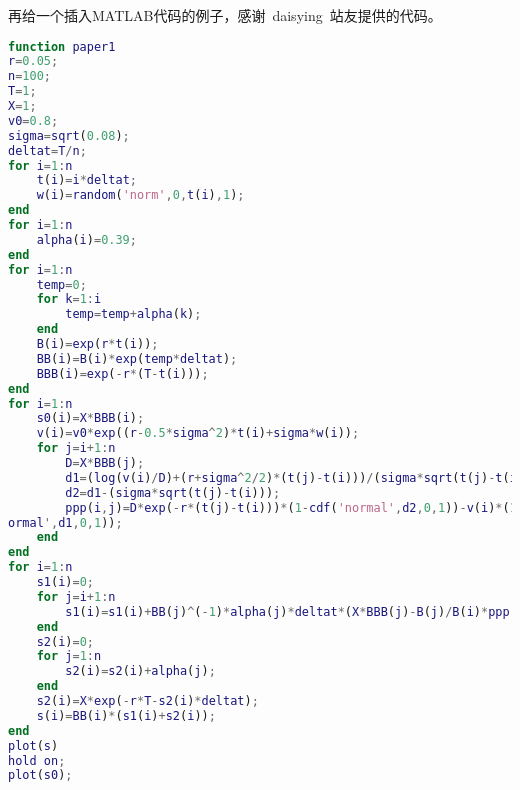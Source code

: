 再给一个插入MATLAB代码的例子，感谢~daisying~站友提供的代码。

\begin{lstlisting}[language={matlab}, caption={一段MATLAB源代码}]
function paper1
r=0.05;
n=100;
T=1;
X=1;
v0=0.8;
sigma=sqrt(0.08);
deltat=T/n;
for i=1:n
    t(i)=i*deltat;
    w(i)=random('norm',0,t(i),1);
end
for i=1:n
    alpha(i)=0.39;
end
for i=1:n
    temp=0;
    for k=1:i
        temp=temp+alpha(k);
    end
    B(i)=exp(r*t(i));
    BB(i)=B(i)*exp(temp*deltat);
    BBB(i)=exp(-r*(T-t(i)));
end
for i=1:n
    s0(i)=X*BBB(i);
    v(i)=v0*exp((r-0.5*sigma^2)*t(i)+sigma*w(i));
    for j=i+1:n
        D=X*BBB(j);
        d1=(log(v(i)/D)+(r+sigma^2/2)*(t(j)-t(i)))/(sigma*sqrt(t(j)-t(i)));
        d2=d1-(sigma*sqrt(t(j)-t(i)));
        ppp(i,j)=D*exp(-r*(t(j)-t(i)))*(1-cdf('normal',d2,0,1))-v(i)*(1-cdf('n
ormal',d1,0,1));
    end
end
for i=1:n
    s1(i)=0;
    for j=i+1:n
        s1(i)=s1(i)+BB(j)^(-1)*alpha(j)*deltat*(X*BBB(j)-B(j)/B(i)*ppp(i,j));
    end
    s2(i)=0;
    for j=1:n
        s2(i)=s2(i)+alpha(j);
    end
    s2(i)=X*exp(-r*T-s2(i)*deltat);
    s(i)=BB(i)*(s1(i)+s2(i));
end
plot(s)
hold on;
plot(s0);
\end{lstlisting}
